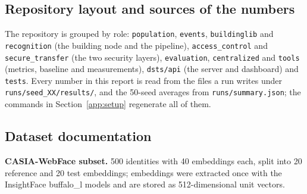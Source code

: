 \documentclass[12pt,a4paper,oneside]{report}
\begin{document}
\subsection{Repository layout and sources of the numbers}
The repository is grouped by role: \texttt{population}, \texttt{events}, \texttt{buildinglib} and \texttt{recognition} (the building node and the pipeline), \texttt{access\_\allowbreak control} and \texttt{secure\_\allowbreak transfer} (the two security layers), \texttt{evaluation}, \texttt{centralized} and \texttt{tools} (metrics, baseline and measurements), \texttt{dsts/api} (the server and dashboard) and \texttt{tests}. Every number in this report is read from the files a run writes under \texttt{runs/seed\_\allowbreak XX/results/}, and the 50-seed averages from \texttt{runs/summary.json}; the commands in Section~\ref{app:setup} regenerate all of them.

\subsection{Dataset documentation}
\textbf{CASIA-WebFace subset.} 500 identities with 40 embeddings each, split into 20 reference and 20 test embeddings; embeddings were extracted once with the InsightFace buffalo\_\allowbreak l models and are stored as 512-dimensional unit vectors.
\end{document}
